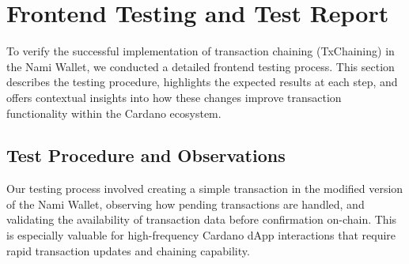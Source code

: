 \documentclass[11pt]{article}
\begin{document}
\section{Frontend Testing and Test Report}

To verify the successful implementation of transaction chaining (TxChaining) in the Nami Wallet, we conducted a detailed frontend testing process. This section describes the testing procedure, highlights the expected results at each step, and offers contextual insights into how these changes improve transaction functionality within the Cardano ecosystem.

\subsection{Test Procedure and Observations}

Our testing process involved creating a simple transaction in the modified version of the Nami Wallet, observing how pending transactions are handled, and validating the availability of transaction data before confirmation on-chain. This is especially valuable for high-frequency Cardano dApp interactions that require rapid transaction updates and chaining capability.
\end{document}
